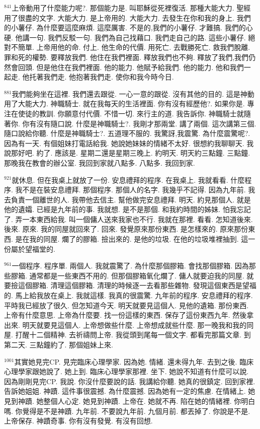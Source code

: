 \documentclass{book}
\begin{document}
$^{841}$上帝動用了什麼能力呢?.
那個能力是.
叫耶穌從死裡復活.
那種大能大力.
聖經用了很盡的文字.
大能大力.
是上帝用的.
大能大力.
去發生在你和我的身上.
我們的小薯仔.
為什麼要這麼麻煩.
這麼厲害.
不是的,我們的小薯仔.
才難搞.
我們的心硬.
他講一句.
我們反駁一句.
我們為自己找藉口.
我們走自己的路.
這些小薯仔.
絕對不簡單.
上帝用他的命.
付上.
他生命的代價.
用死亡.
去戰勝死亡.
救我們脫離.
罪和死的權勢.
要釋放我們.
他住在我們裡面.
釋放我們也不夠.
釋放了我們,我們仍然會回頭.
但是他住在我們裡面.
他的能力.
他賦予給我們.
他的能力.
他和我們一起走.
他托著我們走.
他抱著我們走.
使你和我今時今日.

$^{881}$我們能夠坐在這裡.
我們還去跟從.
一心一意的跟從.
沒有其他的目的.
這是神動用了大能大力.
神職騎士.
就在我每天的生活裡面.
你有沒有經歷他?.
如果你是.
專注在使徒的教訓.
你願意付代價.
不惜一切.
來行主的道.
我告訴你.
神職騎士就隨著你.
你有沒有隨口說.
什麼是神職騎士?.
我剛才那兩堂.
講了兩個.
這次講第三個.
隨口說給你聽.
什麼是神職騎士?.
五道理不服的.
我驚訝,我震驚.
為什麼震驚呢?.
因為有一天.
有個姐妹打電話給我.
她說她妹妹的情緒不太好.
很想約我聊聊天.
我說那好吧.
約了.
應該是.
星期二還是星期三晚上.
約明天.
明天約三點鐘.
三點鐘.
那晚我在教會的辦公室.
我回到家就八點多.
八點多.
我回到家.

$^{921}$就休息.
但在我桌上就放了一份.
安息禮拜的程序.
在我桌上.
我就看看.
什麼程序.
我不是在裝安息禮拜.
那個程序.
那個人的名字.
我幾乎不記得.
因為九年前.
我去負責一個離世的人.
我帶他去信主.
幫他做完安息禮拜.
明天.
約見那個人.
就是他的遺孀.
已經是九年前的事.
我就想.
是不是那個.
和我約時間的姊妹.
怕我忘記了.
弄一本東西給我.
叫一個傭人送來我家也不行.
我就在那裡.
看看.
怎知道後來.
後來.
原來.
我的同屋就回來了.
回來.
發覺原來那份東西.
是怎樣來的.
原來那份東西.
是在我的同屋.
爛了的膠箱.
撿出來的.
是他的垃圾.
在他的垃圾堆裡抽到.
這一份屬於望福堂的.

$^{961}$一個程序.
程序單.
兩個人.
我就震驚了.
為什麼那個膠箱.
會找那個膠箱.
因為那些膠箱.
通常都是一些東西不用的.
但那個膠箱氧化爛了.
傭人就要迫我的同屋.
就要撿這個膠箱.
清理這個膠箱.
清理的時候逐一去看那些雜物.
發現這個東西是望福的.
馬上給我放在桌上.
我就這樣.
我真的很震驚.
九年前的程序.
安息禮拜的程序.
平時我已經放了很久.
但怎知道今天.
明天就要見這個人.
見他的遺箱.
那份東西.
上帝有什麼意思.
上帝為什麼要.
找一份這樣的東西.
保存了這份東西九年.
然後拿出來.
明天就要見這個人.
上帝想做些什麼.
上帝想成就些什麼.
那一晚我和我的同屋.
打醒十二個精神.
去祈禱問上帝.
我從頭到尾每一個文字.
都看完那篇文章.
到第二天.
三點鐘約了.
那個姐妹上來.

$^{1001}$其實她見完CP.
見完臨床心理學家.
因為她.
情緒.
還未得九年.
去到之後.
臨床心理學家跟她說了.
她上到.
臨床心理學家那裡.
坐下.
她說不知道有什麼可以說.
因為剛剛見完CP.
我說.
你沒什麼要說的話.
我講給你聽.
她真的很鎮定.
回到家裡.
告訴她姐姐.
神蹟.
這件事很震撼.
為什麼震撼.
因為她有一定的焦慮.
在情緒上.
她見到神蹟.
她整個人心定.
她見到神蹟.
上帝在.
她就不再.
陷在她的情緒裡.
你明白嗎.
你覺得是不是神蹟.
九年前.
不要說九年前.
九個月前.
都丟掉了.
你說是不是.
上帝保存.
神蹟奇事.
你有沒有發覺.
有沒有回想.
\end{document}

